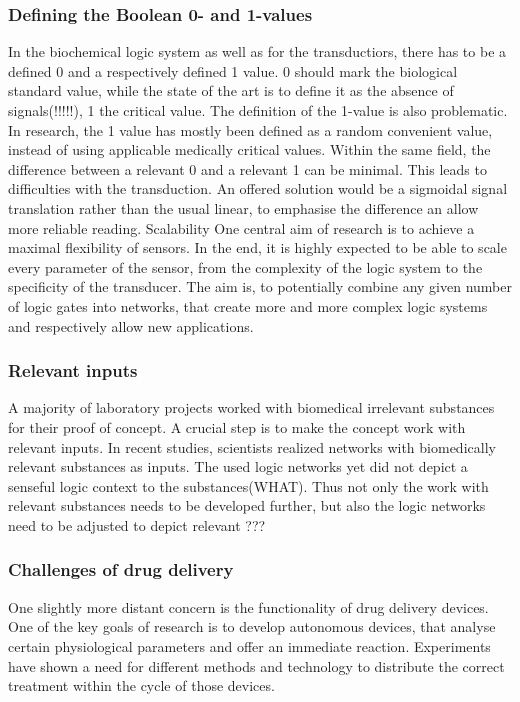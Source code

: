 \documentclass[runningheads]{llncs}
\begin{document}
\subsubsection{Defining the Boolean 0- and 1-values} In the biochemical logic system as well as for the transductiors, there has to be a defined 0 and a respectively defined 1 value. 0 should mark the biological standard value, while the state of the art is to define it as the absence of signals(!!!!!), 1 the critical value. The definition of the 1-value is also problematic. In research, the 1 value has mostly been defined as a random convenient value, instead of using applicable medically critical values. Within the same field, the difference between a relevant 0 and a relevant 1 can be minimal. This leads to difficulties with the transduction. An offered solution would be a sigmoidal signal translation rather than the usual linear, to emphasise the difference an allow more reliable reading.
Scalability		One central aim of research is to achieve a maximal flexibility of sensors. In the end, it is highly expected to be able to scale every parameter of the sensor, from the complexity of the logic system to the specificity of the transducer. The aim is, to potentially combine any given number of logic gates into networks, that create more and more complex logic systems and respectively allow new applications.

\subsubsection{Relevant inputs}	A majority of laboratory projects worked with biomedical irrelevant substances for their proof of concept. A crucial step is to make the concept work with relevant inputs. In recent studies, scientists realized networks with biomedically relevant substances as inputs. The used logic networks yet did not depict a senseful logic context to the substances(WHAT). Thus not only the work with relevant substances needs to be developed further, but also the logic networks need to be adjusted to depict relevant ???\\

\subsubsection{Challenges of drug delivery}	One slightly more distant concern is the functionality of drug delivery devices. One of the key goals of research is to develop autonomous devices, that analyse certain physiological parameters and offer an immediate reaction. Experiments have shown a need for different methods and technology to distribute the correct treatment within the cycle of those devices.
\end{document}
